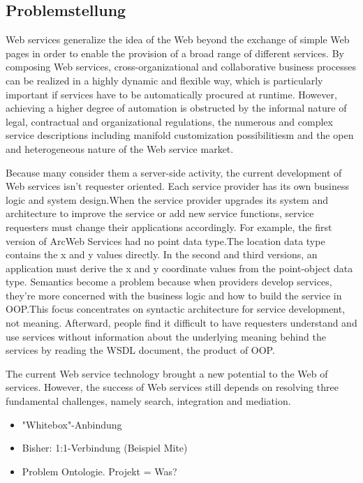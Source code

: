 \documentclass[10pt,a4paper]{article}
\begin{document}
\subsection{Problemstellung}
\label{l:problem}

Web services generalize the idea of the Web beyond the exchange of simple Web pages in order to enable the provision of a broad range of different services. By composing Web services, cross-organizational and collaborative business processes can be realized in a highly dynamic and flexible way, which is particularly important if services have to be automatically procured at runtime. However, achieving a higher degree of automation is obstructed by the informal nature of legal, contractual and organizational regulations, the numerous and complex service descriptions including manifold customization possibilitiesm and the open and heterogeneous nature of the Web service market.

Because many consider them a server-side activity, the
current development of Web services isn’t requester oriented.
Each service provider has its own business logic and
system design.When the service provider upgrades its system
and architecture to improve the service or add new
service functions, service requesters must change their
applications accordingly. For example, the first version of
ArcWeb Services had no point data type.The location data
type contains the x and y values directly. In the second and
third versions, an application must derive the x and y coordinate
values from the point-object data type. Semantics
become a problem because when providers develop services,
they’re more concerned with the business logic and
how to build the service in OOP.This focus concentrates
on syntactic architecture for service development, not
meaning. Afterward, people find it difficult to have
requesters understand and use services without information
about the underlying meaning behind the services by
reading the WSDL document, the product of OOP. \cite{shi1}

The current Web service technology brought a new potential
to the Web of services. However, the success of Web
services still depends on resolving three fundamental challenges,
namely search, integration and mediation. \cite{WSMOLITE}

\begin{itemize}
\item "Whitebox"-Anbindung
\item Bisher: 1:1-Verbindung (Beispiel Mite)
\item Problem Ontologie. Projekt = Was?
\end{itemize}
\end{document}
